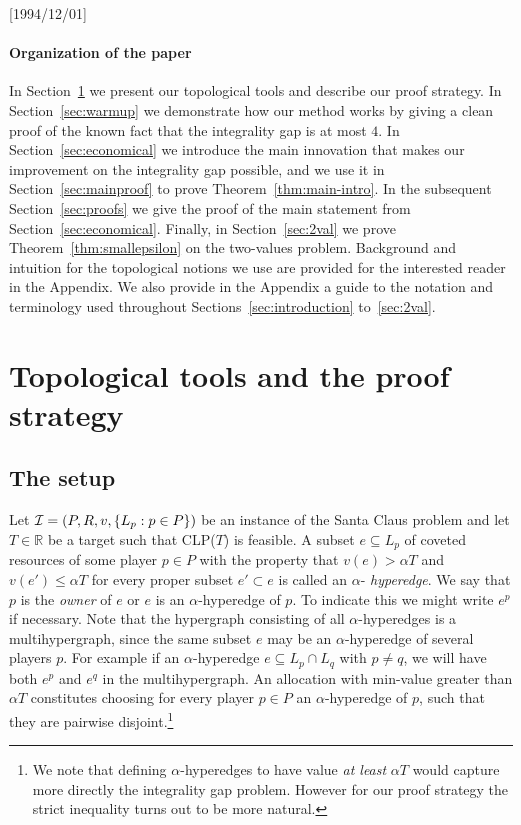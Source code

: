 \NeedsTeXFormat{LaTeX2e}[1994/12/01]\documentclass[letterpaper, 11pt]{article}
\theoremstyle{definition}
\theoremstyle{remark}
\numberwithin{equation}{section}
\begin{document}
\paragraph{Organization of the paper}
In Section~\ref{sec:topology} we present our topological tools and
describe our proof strategy. In Section~\ref{sec:warmup} we
demonstrate how our method works by giving a clean proof of the
known fact
that the integrality gap is at most $4$. In Section~\ref{sec:economical} we
introduce the main innovation that makes our improvement on the
integrality gap possible, and we use it in
Section~\ref{sec:mainproof} to prove Theorem~\ref{thm:main-intro}. In the 
subsequent Section~\ref{sec:proofs} we give the proof of the main statement from Section~\ref{sec:economical}.
Finally, in Section~\ref{sec:2val} we prove
Theorem~\ref{thm:smallepsilon} on the
two-values problem. Background and intuition for the topological notions we use are provided for the interested reader in the Appendix. We also provide in the Appendix a guide to the notation and terminology used throughout Sections~\ref{sec:introduction} to~\ref{sec:2val}.

\section{Topological tools and the proof strategy}\label{sec:topology}

\subsection{The setup} \label{sec:setup}
Let ${\cal I} = (P, R , v, \{L_p : p\in P\})$ be an instance of the
Santa Claus problem and let $T\in \mathbb{R}$ be a target such that
CLP($T$) is feasible.
A subset $e\subseteq L_p$ of coveted resources of some player $p\in P$
with the property that $v(e) > \alpha T$ and $v(e') \leq \alpha T$ for
every proper subset $e'\subset e$ is called an $\alpha$-{\it
  hyperedge}. We say that $p$ is the {\it owner} of $e$ or $e$ is an
$\alpha$-hyperedge of $p$. To
indicate this we might write $e^p$ if necessary.
Note that the hypergraph consisting of all $\alpha$-hyperedges is a
multihypergraph, since the same subset $e$ may be an
$\alpha$-hyperedge of several players $p$.
For example if an $\alpha$-hyperedge $e \subseteq L_p \cap L_q$ with
$p\neq q$, we will have both $e^p$ and $e^q$ in the multihypergraph.
An allocation with min-value greater than
$\alpha T$ constitutes choosing for every player $p\in P$ an 
$\alpha$-hyperedge of $p$, 
such that they are pairwise disjoint.\footnote{We note that defining $\alpha$-hyperedges to have value {\em at least} $\alpha T$ would capture more directly the integrality gap problem. However for our proof strategy the strict inequality turns out to be more natural.}
\end{document}
